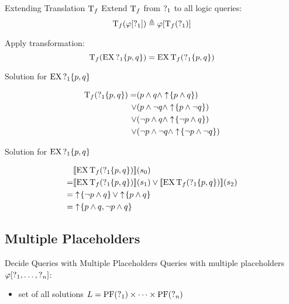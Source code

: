 \begin{frame}{Extending Translation $\operatorname{T}_f$}
  Extend $\operatorname{T}_f$ from $\operatorname{?}_1$ to all logic queries:
  \[ 
    \operatorname{T}_f(\varphi[\operatorname{?}_1]) \triangleq \varphi[\operatorname{T}_f(\operatorname{?}_1)]
  \]
  
  \begin{example}
    Apply transformation:
    \[ \operatorname{T}_f(\operatorname{EX} \operatorname{?}_1\{p,q\}) = \operatorname{EX}\operatorname{T}_f( \operatorname{?}_1\{p,q\}) \]
  \end{example}
\end{frame}

\begin{frame}{Solution for $\operatorname{EX} \operatorname{?}_1\{p,q\}$}
  \begin{example}
    \begin{align*}
      \operatorname{T}_f( \operatorname{?}_1\{p,q\}) 
        =   &(p \land q \land \uparrow \! \left\{ p\land q \right\}) \\
        \lor&(p \land \lnot q \land \uparrow \! \left\{ p\land \lnot q \right\}) \\
        \lor&(\lnot p \land q \land \uparrow \! \left\{ \lnot p\land q \right\}) \\
        \lor&(\lnot p \land \lnot q \land \uparrow \! \left\{ \lnot p\land \lnot q \right\})
    \end{align*}
  \end{example}
\end{frame}

\begin{frame}{Solution for $\operatorname{EX} \operatorname{?}_1\{p,q\}$}
  \begin{example}
    \begin{align*}
      & \llbracket \operatorname{EX} \operatorname{T}_f( \operatorname{?}_1\{p,q\}) \rrbracket (s_0) \\
        =& \llbracket \operatorname{EX} \operatorname{T}_f( \operatorname{?}_1\{p,q\}) \rrbracket (s_1) \lor \llbracket \operatorname{EX} \operatorname{T}_f( \operatorname{?}_1\{p,q\}) \rrbracket (s_2) \\
        =& \uparrow \! \left\{ \lnot p\land q \right\} \lor \uparrow \! \left\{ p\land q \right\} \\
        =& \uparrow \! \left\{ p\land q, \lnot p\land q \right\} 
    \end{align*}
  \end{example}
\end{frame}

\subsection{Multiple Placeholders}%

\begin{frame}{Decide Queries with Multiple Placeholders}
  Queries with multiple placeholders $\varphi[\operatorname{?}_1,\ldots,\operatorname{?}_n]$:
  \begin{itemize}
    \item set of all solutions $L = \operatorname{PF}(\operatorname{?}_1)\times \cdots \times \operatorname{PF}(\operatorname{?}_n)$
  \end{itemize}
\end{frame}

